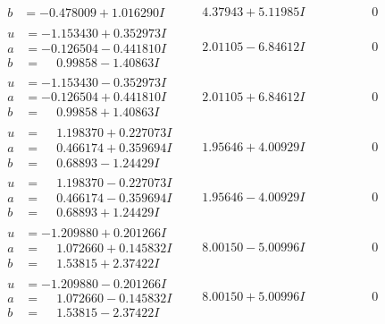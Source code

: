 \documentclass[1p]{elsarticle_modified}
\theoremstyle{definition}
\begin{document}
$$\begin{array}{c|c|c}
\begin{aligned}
b &= -0.478009 + 1.016290 I\end{aligned}
 & \phantom{-}4.37943 + 5.11985 I & \phantom{-0.000000 } 0 \\ \hline\begin{aligned}
u &= -1.153430 + 0.352973 I \\
a &= -0.126504 - 0.441810 I \\
b &= \phantom{-}0.99858 - 1.40863 I\end{aligned}
 & \phantom{-}2.01105 - 6.84612 I & \phantom{-0.000000 } 0 \\ \hline\begin{aligned}
u &= -1.153430 - 0.352973 I \\
a &= -0.126504 + 0.441810 I \\
b &= \phantom{-}0.99858 + 1.40863 I\end{aligned}
 & \phantom{-}2.01105 + 6.84612 I & \phantom{-0.000000 } 0 \\ \hline\begin{aligned}
u &= \phantom{-}1.198370 + 0.227073 I \\
a &= \phantom{-}0.466174 + 0.359694 I \\
b &= \phantom{-}0.68893 - 1.24429 I\end{aligned}
 & \phantom{-}1.95646 + 4.00929 I & \phantom{-0.000000 } 0 \\ \hline\begin{aligned}
u &= \phantom{-}1.198370 - 0.227073 I \\
a &= \phantom{-}0.466174 - 0.359694 I \\
b &= \phantom{-}0.68893 + 1.24429 I\end{aligned}
 & \phantom{-}1.95646 - 4.00929 I & \phantom{-0.000000 } 0 \\ \hline\begin{aligned}
u &= -1.209880 + 0.201266 I \\
a &= \phantom{-}1.072660 + 0.145832 I \\
b &= \phantom{-}1.53815 + 2.37422 I\end{aligned}
 & \phantom{-}8.00150 - 5.00996 I & \phantom{-0.000000 } 0 \\ \hline\begin{aligned}
u &= -1.209880 - 0.201266 I \\
a &= \phantom{-}1.072660 - 0.145832 I \\
b &= \phantom{-}1.53815 - 2.37422 I\end{aligned}
 & \phantom{-}8.00150 + 5.00996 I & \phantom{-0.000000 } 0\\

\end{array}$$
\end{document}
